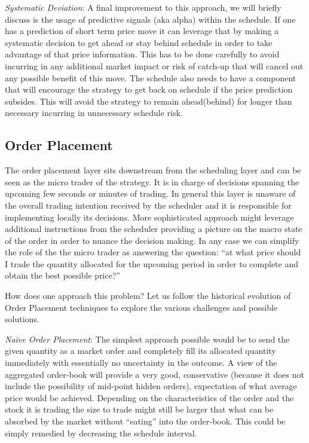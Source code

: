 \noindent\emph{Systematic Deviation}: A final improvement to this approach, we will briefly discuss is the usage of predictive signals (aka alpha) within the schedule. If one has a prediction of short term price move it can leverage that by making a systematic decision to get ahead or stay behind schedule in order to take advantage of that price information. This has to be done carefully to avoid incurring in any additional market impact or risk of catch-up that will cancel out any possible benefit of this move. The schedule also needs to have a component that will encourage the strategy to get back on schedule if the price prediction subsides. This will avoid the strategy to remain ahead(behind) for longer than necessary incurring in unnecessary schedule risk.



\subsection{Order Placement}

The order placement layer sits downstream from the scheduling layer and can be seen as the micro trader of the strategy. It is in charge of decisions spanning the upcoming few seconds or minutes of trading. In general this layer is unaware of the overall trading intention received by the scheduler and it is responsible for implementing locally its decisions. More sophisticated approach might leverage  additional instructions from the scheduler providing a picture on the macro state of the order in  order to nuance the decision making. In any case we can simplify the role of the the micro trader as answering the question: ``at what price should I trade the quantity allocated for the upcoming period in order to complete and obtain the best possible price?'' 


How does one approach this problem? Let us follow the historical evolution of Order Placement techniques to explore the various challenges and possible solutions. \twomedskip


\noindent\emph{Na\"ive Order Placement}: The simplest approach possible would be to send the given quantity as a market order and completely fill its allocated quantity immediately with essentially no uncertainty in the outcome. A view of the aggregated order-book will provide a very good, conservative (because it does not include the possibility of mid-point hidden orders), expectation of what average price would be achieved. Depending on the characteristics of the order and the stock it is trading the size to trade might still be larger that what can be absorbed by the market without ``eating'' into the order-book. This could be simply remedied by decreasing the schedule interval.


